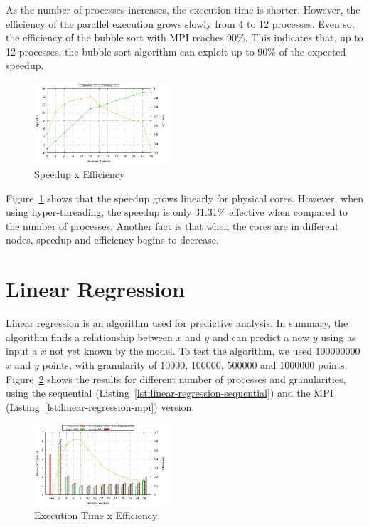 \documentclass[10pt, twocolumn]{report}
\begin{document}
As the number of processes increases, the execution time is shorter. However, the efficiency of the parallel execution grows slowly from 4 to 12 processes. Even so, the efficiency of the bubble sort with MPI reaches 90\%. This indicates that, up to 12 processes, the bubble sort algorithm can exploit up to 90\% of the expected speedup.

\begin{figure}[ht]
	\centering
	\includegraphics[width=0.45\textwidth]{../logs/scripts/bubble-sort-speedup-efficiency.pdf}
	\caption{Speedup x Efficiency}
	\label{fig:bubble-sort-speedup-efficiency}
\end{figure}

Figure~\ref{fig:bubble-sort-speedup-efficiency} shows that the speedup grows linearly for physical cores. However, when using hyper-threading, the speedup is only 31.31\% effective when compared to the number of processes. Another fact is that when the cores are in different nodes, speedup and efficiency begins to decrease.

\section {Linear Regression}
Linear regression is an algorithm used for predictive analysis. In summary, the algorithm finds a relationship between $x$ and $y$ and can predict a new $y$ using as input a $x$ not yet known by the model. To test the algorithm, we used 100000000 $x$ and $y$ points, with granularity of 10000, 100000, 500000 and 1000000 points. Figure~\ref{fig:linear-regression-time} shows the results for different number of processes and granularities, using the sequential (Listing~\ref{lst:linear-regression-sequential}) and the MPI (Listing~\ref{lst:linear-regression-mpi}) version.

\begin{figure}[ht]
	\centering
	\includegraphics[width=0.45\textwidth]{../logs/scripts/linear-regression-time.pdf}
	\caption{Execution Time x Efficiency}
	\label{fig:linear-regression-time}
\end{figure}
\end{document}
